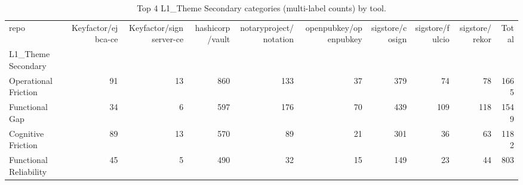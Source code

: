 \begin{table}[t]
\centering
\caption{Top 4 L1_Theme Secondary categories (multi-label counts) by tool.}
\label{tab:phase3-l1_theme-secondary}
\scriptsize
\begin{tabular}{lrrrrrrrrr}
\toprule
repo & Keyfactor/ejbca-ce & Keyfactor/signserver-ce & hashicorp/vault & notaryproject/notation & openpubkey/openpubkey & sigstore/cosign & sigstore/fulcio & sigstore/rekor & Total \\
L1_Theme Secondary &  &  &  &  &  &  &  &  &  \\
\midrule
Operational Friction & 91 & 13 & 860 & 133 & 37 & 379 & 74 & 78 & 1665 \\
Functional Gap & 34 & 6 & 597 & 176 & 70 & 439 & 109 & 118 & 1549 \\
Cognitive Friction & 89 & 13 & 570 & 89 & 21 & 301 & 36 & 63 & 1182 \\
Functional Reliability & 45 & 5 & 490 & 32 & 15 & 149 & 23 & 44 & 803 \\
\bottomrule
\end{tabular}

\end{table}
